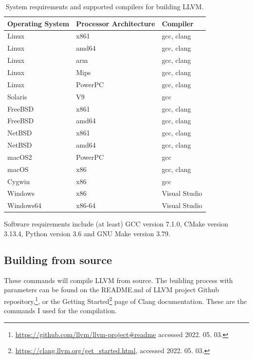 \begin{table}[H]
	\centering
	\begin{tabular}{ | m{} | m{} | m{} | }
		\hline
		\textbf{Operating System} & \textbf{Processor Architecture} & \textbf{Compiler} \\
		\hline \hline
		Linux & x861 & gcc, clang \\
		\hline
		Linux & amd64 & gcc, clang \\
		\hline
		Linux & arm & gcc, clang \\
		\hline
		Linux & Mips & gcc, clang \\
		\hline
		Linux & PowerPC & gcc, clang \\
		\hline
		Solaris & V9 & gcc \\
		\hline
		FreeBSD & x861 & gcc, clang \\
		\hline
		FreeBSD & amd64 & gcc, clang \\
		\hline
		NetBSD & x861 & gcc, clang \\
		\hline
		NetBSD & amd64 & gcc, clang \\
		\hline
		macOS2 & PowerPC & gcc \\
		\hline
		macOS & x86 & gcc, clang \\
		\hline
		Cygwin & x86 & gcc \\
		\hline
		Windows & x86 & Visual Studio \\
		\hline
		Windows64 & x86-64 & Visual Studio \\
		\hline
	\end{tabular}
	\caption{System requirements and supported compilers for building LLVM.}
	\label{tab:clang-req}
\end{table}

Software requirements include (at least) GCC version 7.1.0, CMake version 3.13.4, Python version 3.6 and GNU Make version 3.79.

\subsection{Building from source}

These commands will compile LLVM from source. The building process with parameters can be found on the README.md of
LLVM project Github repository,\footnote{\url{https://github.com/llvm/llvm-project#readme} accessed 2022. 05. 03.}, or the Getting
Started\footnote{\url{https://clang.llvm.org/get_started.html}, accessed 2022. 05. 03.} page of Clang documentation. These are the commands I used for
the compilation.


